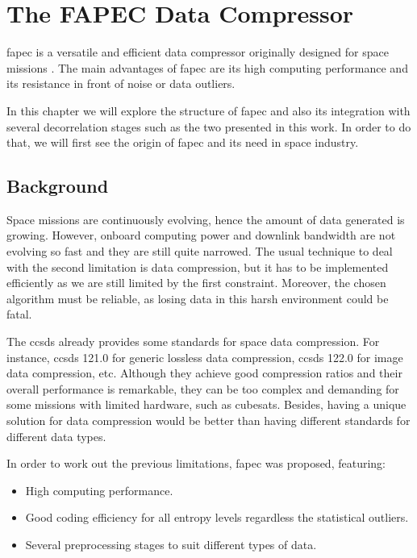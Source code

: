 \chapter{The FAPEC Data Compressor} \label{ch:fapec}
\acrfull{fapec} is a versatile and efficient data compressor originally designed for space missions \parencite{PaperFAPEC}. The main advantages of \acrshort{fapec} are its high computing performance and its resistance in front of noise or data outliers.

In this chapter we will explore the structure of \acrshort{fapec} and also its integration with several decorrelation stages such as the two presented in this work. In order to do that, we will first see the origin of \acrshort{fapec} and its need in space industry.

\section{Background}
Space missions are continuously evolving, hence the amount of data generated is growing. However, onboard computing power and downlink bandwidth are not evolving so fast and they are still quite narrowed. The usual technique to deal with the second limitation is data compression, but it has to be implemented efficiently as we are still limited by the first constraint. Moreover, the chosen algorithm must be reliable, as losing data in this harsh environment could be fatal.

The \acrfull{ccsds} already provides some standards for space data compression. For instance, \acrshort{ccsds} 121.0 for generic lossless data compression, \acrshort{ccsds} 122.0 \parencite{ccsds122} for image data compression, etc. Although they achieve good compression ratios and their overall performance is remarkable, they can be too complex and demanding for some missions with limited hardware, such as cubesats. Besides, having a unique solution for data compression would be better than having different standards for different data types.

In order to work out the previous limitations, \acrshort{fapec} was proposed, featuring:
\begin{itemize}
	\item High computing performance.
	\item Good coding efficiency for all entropy levels regardless the statistical outliers.
	\item Several preprocessing stages to suit different types of data.
\end{itemize}

